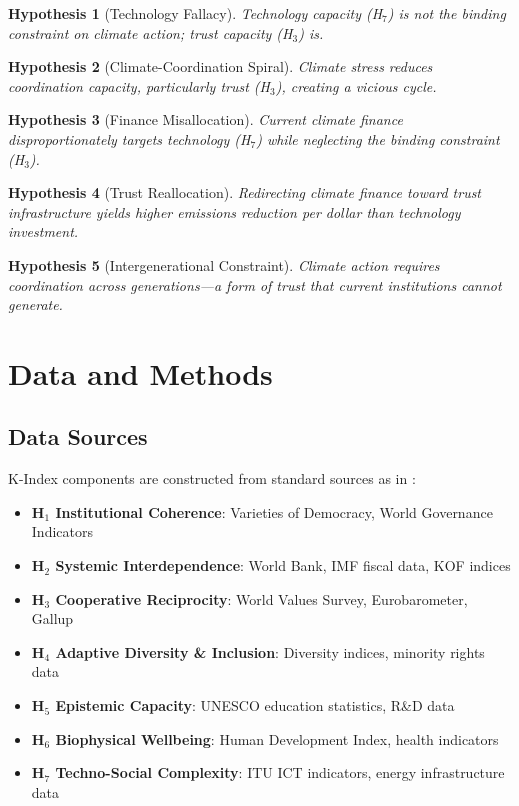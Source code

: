 \documentclass[12pt,a4paper]{article}
\newtheorem{hypothesis}{Hypothesis}
\begin{document}
\begin{hypothesis}[Technology Fallacy]
Technology capacity (H$_7$) is not the binding constraint on climate action; trust capacity (H$_3$) is.
\end{hypothesis}

\begin{hypothesis}[Climate-Coordination Spiral]
Climate stress reduces coordination capacity, particularly trust (H$_3$), creating a vicious cycle.
\end{hypothesis}

\begin{hypothesis}[Finance Misallocation]
Current climate finance disproportionately targets technology (H$_7$) while neglecting the binding constraint (H$_3$).
\end{hypothesis}

\begin{hypothesis}[Trust Reallocation]
Redirecting climate finance toward trust infrastructure yields higher emissions reduction per dollar than technology investment.
\end{hypothesis}

\begin{hypothesis}[Intergenerational Constraint]
Climate action requires coordination across generations---a form of trust that current institutions cannot generate.
\end{hypothesis}

\section{Data and Methods}
\label{sec:methods}

\subsection{Data Sources}

K-Index components are constructed from standard sources as in \citet{Paper1}:

\begin{itemize}
    \item \textbf{H$_1$ Institutional Coherence}: Varieties of Democracy, World Governance Indicators
    \item \textbf{H$_2$ Systemic Interdependence}: World Bank, IMF fiscal data, KOF indices
    \item \textbf{H$_3$ Cooperative Reciprocity}: World Values Survey, Eurobarometer, Gallup
    \item \textbf{H$_4$ Adaptive Diversity \& Inclusion}: Diversity indices, minority rights data
    \item \textbf{H$_5$ Epistemic Capacity}: UNESCO education statistics, R\&D data
    \item \textbf{H$_6$ Biophysical Wellbeing}: Human Development Index, health indicators
    \item \textbf{H$_7$ Techno-Social Complexity}: ITU ICT indicators, energy infrastructure data
\end{itemize}
\end{document}
